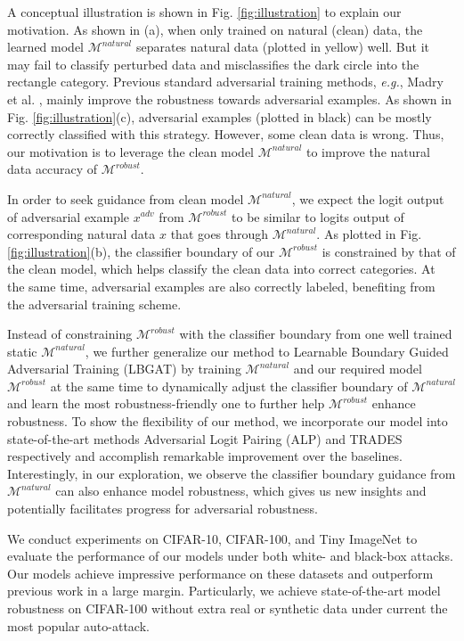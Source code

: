 \documentclass[10pt,twocolumn,letterpaper]{article}
\begin{document}
A conceptual illustration is shown in Fig. \ref{fig:illustration} to explain our motivation. As shown in (a), when only trained on natural (clean) data, the learned model $\mathcal{M}^{natural}$ separates natural data (plotted in yellow) well. But it may fail to classify perturbed data and misclassifies the dark circle into the rectangle category. Previous standard adversarial training methods, {\it e.g.}, Madry et al. \cite{DBLP:conf/iclr/MadryMSTV18}, mainly improve the robustness towards adversarial examples. As shown in Fig. \ref{fig:illustration}(c), adversarial examples (plotted in black) can be mostly correctly classified with this strategy. However, some clean data is wrong. Thus, our motivation is to leverage the clean model $\mathcal{M}^{natural}$ to improve the natural data accuracy of $\mathcal{M}^{robust}$.

In order to seek guidance from clean model $\mathcal{M}^{natural}$, we expect the logit output of adversarial example $x^{adv}$ from $\mathcal{M}^{robust}$ to be similar to logits output of corresponding natural data $x$ that goes through $\mathcal{M}^{natural}$. As plotted in Fig. \ref{fig:illustration}(b), the classifier boundary of our $\mathcal{M}^{robust}$ is constrained by that of the clean model, which helps classify the clean data into correct categories. At the same time, adversarial examples are also correctly labeled, benefiting from the adversarial training scheme.

Instead of constraining $\mathcal{M}^{robust}$ with the classifier boundary from one well trained static $\mathcal{M}^{natural}$,
we further generalize our method to Learnable Boundary Guided Adversarial Training (LBGAT) by training $\mathcal{M}^{natural}$ and our required model $\mathcal{M}^{robust}$ at the same time to dynamically adjust the classifier boundary of $\mathcal{M}^{natural}$ and learn the most robustness-friendly one to further help $\mathcal{M}^{robust}$ enhance robustness. To show the flexibility of our method, we incorporate our model into state-of-the-art methods Adversarial Logit Pairing (ALP) \cite{DBLP:journals/corr/abs-1803-06373} and TRADES \cite{zhang2019theoretically} respectively and accomplish remarkable improvement over the baselines. Interestingly, in our exploration, we observe the classifier boundary guidance from $\mathcal{M}^{natural}$ can also enhance model robustness, which gives us new insights and potentially facilitates progress for adversarial robustness. 

We conduct experiments on CIFAR-10, CIFAR-100, and Tiny ImageNet to evaluate the performance of our models under both white- and black-box attacks. Our models achieve impressive performance on these datasets and outperform previous work in a large margin. Particularly, we achieve state-of-the-art model robustness on CIFAR-100 without extra real or synthetic data under current the most popular auto-attack.
\end{document}
